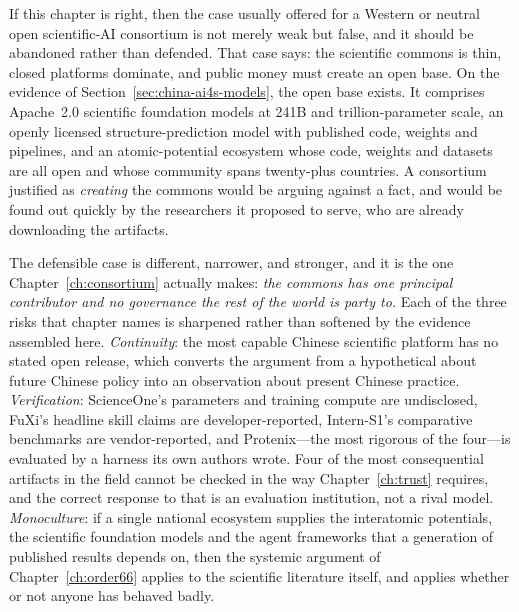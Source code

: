 If this chapter is right, then the case usually offered for a Western or neutral open scientific-AI consortium is not merely weak but false, and it should be abandoned rather than defended. That case says: the scientific commons is thin, closed platforms dominate, and public money must create an open base. On the evidence of Section~\ref{sec:china-ai4s-models}, the open base exists. It comprises Apache~2.0 scientific foundation models at 241B and trillion-parameter scale, an openly licensed structure-prediction model with published code, weights and pipelines, and an atomic-potential ecosystem whose code, weights and datasets are all open and whose community spans twenty-plus countries. A consortium justified as \emph{creating} the commons would be arguing against a fact, and would be found out quickly by the researchers it proposed to serve, who are already downloading the artifacts.

The defensible case is different, narrower, and stronger, and it is the one Chapter~\ref{ch:consortium} actually makes: \emph{the commons has one principal contributor and no governance the rest of the world is party to.} Each of the three risks that chapter names is sharpened rather than softened by the evidence assembled here. \emph{Continuity}: the most capable Chinese scientific platform has no stated open release, which converts the argument from a hypothetical about future Chinese policy into an observation about present Chinese practice. \emph{Verification}: ScienceOne's parameters and training compute are undisclosed, FuXi's headline skill claims are developer-reported, Intern-S1's comparative benchmarks are vendor-reported, and Protenix---the most rigorous of the four---is evaluated by a harness its own authors wrote. Four of the most consequential artifacts in the field cannot be checked in the way Chapter~\ref{ch:trust} requires, and the correct response to that is an evaluation institution, not a rival model. \emph{Monoculture}: if a single national ecosystem supplies the interatomic potentials, the scientific foundation models and the agent frameworks that a generation of published results depends on, then the systemic argument of Chapter~\ref{ch:order66} applies to the scientific literature itself, and applies whether or not anyone has behaved badly.

